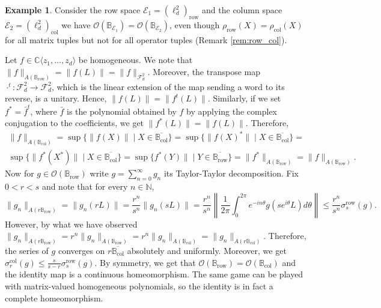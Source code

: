 \documentclass[12pt]{amsart}
\numberwithin{equation}{section}
\theoremstyle{definition}
\newtheorem{example}[theorem]{Example}
\newcommand{\cE}{\mathcal{E}}
\newcommand{\cF}{\mathcal{F}}
\newcommand{\cO}{\mathcal{O}}
\newcommand{\bB}{\mathbb{B}}
\newcommand{\C}{\mathbb{C}}
\newcommand{\bN}{\mathbb{N}}
\begin{document}
\begin{example} \label{ex:insufficent_OBE} 
    Consider the row space $\cE_1 = \left(\ell^2_d \right)_{\operatorname{row}}$ and the column space $\cE_2 = \left(\ell^2_d  \right)_{\operatorname{col}}$ we have $\cO(\bB_{\cE_1}) = \cO(\bB_{\cE_2})$, even though $\rho_{\operatorname{row}}(X) = \rho_{\operatorname{col}}(X)$ for all matrix tuples but not for all operator tuples (Remark \ref{rem:row_col}). 

    Let $f \in \C \langle z_1,\ldots,z_d \rangle$ be homogeneous. We note that $\|f\|_{A(\bB_{\operatorname{row}})} = \|f(L)\| = \|f\|_{\cF^2_d}$. Moreover, the transpose map $\cdot^t \colon \cF^2_d \to \cF^2_d$, which is the linear extension of the map sending a word to its reverse, is a unitary. Hence, $\|f(L)\| = \|f^t(L)\|$. Similarly, if we set $f^* = \bar{f}^t$, where $\bar{f}$ is the polynomial obtained by $f$ by applying the complex conjugation to the coefficients, we get $\|f^*(L)\| = \|f(L)\|$. Therefore,
    \begin{multline*}
    \|f\|_{A(\bB_{\operatorname{col}})} = \sup\{ \|f(X)\| \mid X \in \overline{\bB_{\operatorname{col}}} \} = \sup\{ \|f(X)^*\| \mid X \in \overline{\bB_{\operatorname{col}}} \} = \\ \sup\{ \|f^*(X^*)\| \mid X \in \overline{\bB_{\operatorname{col}}} \} = \sup\{f^*(Y)\| \mid Y \in \overline{\bB_{\operatorname{row}}} \} = \|f^*\|_{A(\bB_{\operatorname{row}})} = \|f\|_{A(\bB_{\operatorname{row}})}.
    \end{multline*}
    Now for $g \in \cO(\bB_{\operatorname{row}})$ write $g = \sum_{n = 0}^{\infty} g_n$ its Taylor-Taylor decomposition. Fix $0 < r < s$ and note that for every $n \in \bN$,
    \[
    \|g_n\|_{A(r \bB_{\operatorname{row}})} = \|g_n(r L)\| = \frac{r^n}{s^n} \|g_n(s L)\| = \frac{r^n}{s^n} \left\| \frac{1}{2\pi} \int_0^{2 \pi} e^{- i n \theta} g(s e^{i\theta} L) d\theta \right\| \leq \frac{r^n}{s^n} \sigma_s^{\operatorname{row}}(g).
    \]
    However, by what we have observed $\|g_n\|_{A(r \bB_{\operatorname{row}})} = r^n \|g_n\|_{A(\bB_{\operatorname{row}})} = r^n \|g_n\|_{A(\bB_{\operatorname{col}})} = \|g_n\|_{A(r \bB_{\operatorname{col}})}$. Therefore, the series of $g$ converges on $r \overline{\bB_{\operatorname{col}}}$ absolutely and uniformly. Moreover, we get $\sigma_r^{\operatorname{col}}(g) \leq \frac{s}{s - r} \sigma_s^{\operatorname{row}}(g)$. By symmetry, we get that $\cO(\bB_{\operatorname{row}}) = \cO(\bB_{\operatorname{col}})$ and the identity map is a continuous homeomorphism. The same game can be played with matrix-valued homogeneous polynomials, so the identity is in fact a complete homeomorphism.
\end{example}
\end{document}
